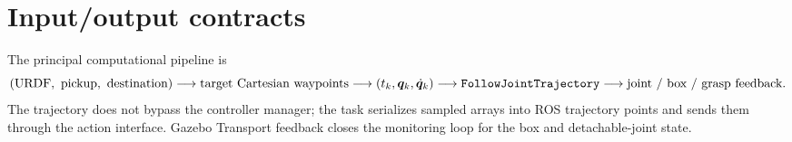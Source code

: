 \section{Input/output contracts}
The principal computational pipeline is
\begin{equation}
 (\text{URDF},\ \text{pickup},\ \text{destination})
 \longrightarrow \text{target Cartesian waypoints}
 \longrightarrow (t_k,\qvec_k,\dot{\qvec}_k)
 \longrightarrow \texttt{FollowJointTrajectory}
 \longrightarrow \text{joint / box / grasp feedback}.
\end{equation}
The trajectory does not bypass the controller manager; the task serializes
sampled arrays into ROS trajectory points and sends them through the action
interface. Gazebo Transport feedback closes the monitoring loop for the box
and detachable-joint state.
